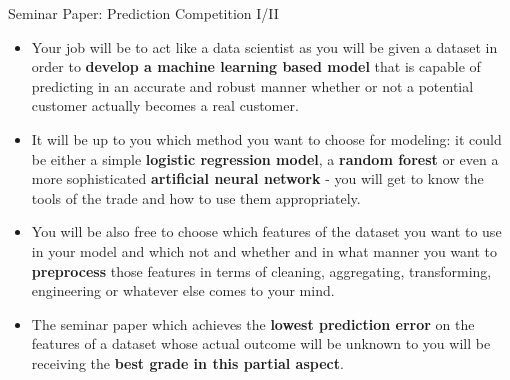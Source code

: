 \documentclass[main.tex]{subfiles}
\begin{document}
    \begin{frame}{Seminar Paper: Prediction Competition I/II}
        \begin{itemize}
            \item Your job will be to act like a data scientist as you will be given a dataset in order to \textbf{develop a machine learning based model} that is capable of predicting in an accurate and robust manner whether or not a potential customer actually becomes a real customer.
            \item It will be up to you which method you want to choose for modeling: it could be either a simple \textbf{logistic regression model}, a \textbf{random forest} or even a more sophisticated \textbf{artificial neural network} - you will get to know the tools of the trade and how to use them appropriately.
            \item You will be also free to choose which features of the dataset you want to use in your model and which not and whether and in what manner you want to \textbf{preprocess} those features in terms of cleaning, aggregating, transforming, engineering or whatever else comes to your mind.
            \item The seminar paper which achieves the \textbf{lowest prediction error} on the features of a dataset whose actual outcome will be unknown to you will be receiving the \textbf{best grade in this partial aspect}.
        \end{itemize}
    \end{frame}
\end{document}
